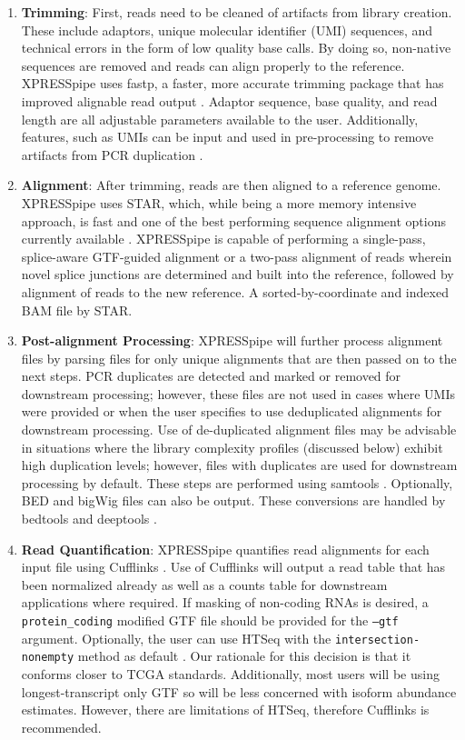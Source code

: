 \documentclass[11pt, a4paper, oneside]{article}
\begin{document}
\begin{enumerate}
  \item \textbf{Trimming}: First, reads need to be cleaned of artifacts from library creation. These include adaptors, unique molecular identifier (UMI) sequences, and technical errors in the form of low quality base calls. By doing so, non-native sequences are removed and reads can align properly to the reference. XPRESSpipe uses fastp, a faster, more accurate trimming package that has improved alignable read output \cite{fastp}. Adaptor sequence, base quality, and read length are all adjustable parameters available to the user. Additionally, features, such as UMIs can be input and used in pre-processing to remove artifacts from PCR duplication \cite{umi}.
  \item \textbf{Alignment}: After trimming, reads are then aligned to a reference genome. XPRESSpipe uses STAR, which, while being a more memory intensive approach, is fast and one of the  best performing sequence alignment options currently available \cite{star, baruzzo_natmeth}. XPRESSpipe is capable of performing a single-pass, splice-aware GTF-guided alignment or a two-pass alignment of reads wherein novel splice junctions are determined and built into the reference, followed by alignment of reads to the new reference. A sorted-by-coordinate and indexed BAM file by STAR.
  \item \textbf{Post-alignment Processing}: XPRESSpipe will further process alignment files by parsing files for only unique alignments that are then passed on to the next steps. PCR duplicates are detected and marked or removed for downstream processing; however, these files are not used in cases where UMIs were provided or when the user specifies to use deduplicated alignments for downstream processing. Use of de-duplicated alignment files may be advisable in situations where the library complexity profiles (discussed below) exhibit high duplication levels; however, files with duplicates are used for downstream processing by default. These steps are performed using samtools \cite{samtools}. Optionally, BED and bigWig files can also be output. These conversions are handled by bedtools \cite{bedtools} and deeptools \cite{deeptools}.
  \item \textbf{Read Quantification}: XPRESSpipe quantifies read alignments for each input file using Cufflinks \cite{cufflinks, count_benchmark}. Use of Cufflinks will output a read table that has been normalized already as well as a counts table for downstream applications where required. If masking of non-coding RNAs is desired, a \texttt{protein\_coding} modified GTF file should be provided for the \texttt{--gtf} argument. Optionally, the user can use HTSeq with the \texttt{intersection-nonempty} method as default \cite{htseq, count_benchmark}. Our rationale for this decision is that it conforms closer to TCGA standards. Additionally, most users will be using longest-transcript only GTF so will be less concerned with isoform abundance estimates. However, there are limitations of HTSeq, therefore Cufflinks is recommended.

\end{enumerate}
\end{document}

